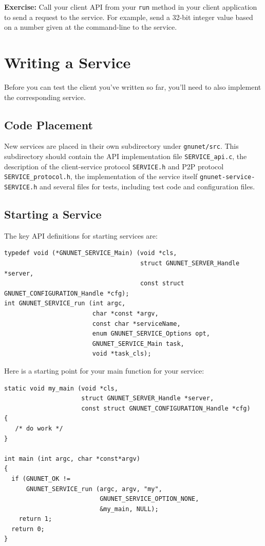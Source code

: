 \documentclass[10pt]{article}
\newcommand{\exercise}[1]{\noindent\begin{boxedminipage}{\textwidth}{\bf Exercise:} #1 \end{boxedminipage}}
\begin{document}
\exercise{Call your client API from your {\tt run} method
in your client application to send a request to the service.
For example, send a 32-bit integer value based on a number given
at the command-line to the service.}


  
\section{Writing a Service}

Before you can test the client you've written so far, you'll need to also
implement the corresponding service.


\subsection{Code Placement}

New services are placed in their own subdirectory under {\tt gnunet/src}.
This subdirectory should contain the API implementation file {\tt SERVICE\_api.c},
the description of the client-service protocol {\tt SERVICE.h} and P2P protocol
{\tt SERVICE\_protocol.h}, the implementation of the service itself
{\tt gnunet-service-SERVICE.h} and several files for tests, including test code
and configuration files.

\subsection{Starting a Service}

The key API definitions for starting services are:
\lstset{language=C}
\begin{lstlisting}
typedef void (*GNUNET_SERVICE_Main) (void *cls,
                                     struct GNUNET_SERVER_Handle *server,
                                     const struct GNUNET_CONFIGURATION_Handle *cfg);
int GNUNET_SERVICE_run (int argc,
                        char *const *argv,
                        const char *serviceName,
                       	enum GNUNET_SERVICE_Options opt,
                        GNUNET_SERVICE_Main task,
                        void *task_cls);
\end{lstlisting}

Here is a starting point for your main function for your service:

\lstset{language=c}
\begin{lstlisting}
static void my_main (void *cls,
                     struct GNUNET_SERVER_Handle *server,
                     const struct GNUNET_CONFIGURATION_Handle *cfg)
{ 
   /* do work */  
}

int main (int argc, char *const*argv) 
{
  if (GNUNET_OK != 
      GNUNET_SERVICE_run (argc, argv, "my", 
                          GNUNET_SERVICE_OPTION_NONE, 
                          &my_main, NULL);
    return 1;
  return 0;    
}
\end{lstlisting}
\end{document}
